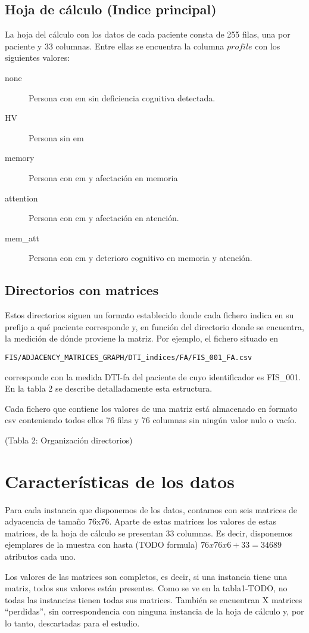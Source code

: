 \subsection{Hoja de cálculo (Indice principal)}
La hoja del cálculo con los datos de cada paciente consta de 255 filas, una por paciente
y 33 columnas. Entre ellas se encuentra la columna $profile$ con los siguientes valores:

\begin{description}
\item [none] Persona con \gls{em} sin deficiencia cognitiva detectada.
\item [HV] Persona sin \gls{em}
\item [memory] Persona con \gls{em} y afectación en memoria
\item [attention] Persona con \gls{em} y afectación en atención.
\item [mem\_att] Persona con \gls{em} y deterioro cognitivo en memoria y atención.
\end{description}

\subsection{Directorios con matrices}
Estos directorios siguen un formato establecido donde cada fichero indica en su prefijo a qué paciente corresponde y, en función del directorio donde se encuentra, la medición de dónde proviene la matriz. Por ejemplo, el fichero situado en
\begin{lstlisting}
FIS/ADJACENCY_MATRICES_GRAPH/DTI_indices/FA/FIS_001_FA.csv
\end{lstlisting}
corresponde con la medida DTI-\gls{fa} del paciente de cuyo identificador es FIS\_001. En la tabla 2 se describe detalladamente esta estructura.

Cada fichero que contiene los valores de una matriz está almacenado en formato \gls{csv} conteniendo todos ellos 76 filas y 76 columnas sin ningún valor nulo o vacío.

(Tabla 2: Organización directorios)

\section{Características de los datos}
Para cada instancia que disponemos de los datos, contamos con seis matrices de adyacencia de tamaño 76x76. Aparte de estas matrices los valores de estas matrices, de la hoja de cálculo se presentan 33 columnas. Es decir, disponemos ejemplares de la muestra con hasta (TODO formula)  $76 x 76 x 6 + 33 = 34689$ atributos cada uno. 

Los valores de las matrices son completos, es decir, si una instancia tiene una matriz, todos sus valores están presentes. Como se ve en la tabla1-TODO, no todas las instancias tienen todas sus matrices. También se encuentran X matrices ``perdidas'', sin correspondencia con ninguna instancia de la hoja de cálculo y, por lo tanto, descartadas para el estudio. 
